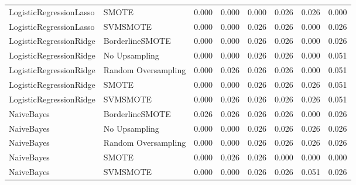 \begin{tabular}{llllllll}
     LogisticRegressionLasso &               SMOTE & 0.000 &                     0.000 &                 0.000 &                  0.026 &                                   0.026 &     0.000 \\
     LogisticRegressionLasso &            SVMSMOTE & 0.000 &                     0.000 &                 0.026 &                  0.026 &                                   0.000 &     0.026 \\
     LogisticRegressionRidge &     BorderlineSMOTE & 0.000 &                     0.000 &                 0.026 &                  0.026 &                                   0.000 &     0.026 \\
     LogisticRegressionRidge &       No Upsampling & 0.000 &                     0.000 &                 0.026 &                  0.026 &                                   0.000 &     0.051 \\
     LogisticRegressionRidge & Random Oversampling & 0.000 &                     0.026 &                 0.026 &                  0.026 &                                   0.000 &     0.051 \\
     LogisticRegressionRidge &               SMOTE & 0.000 &                     0.000 &                 0.026 &                  0.026 &                                   0.026 &     0.051 \\
     LogisticRegressionRidge &            SVMSMOTE & 0.000 &                     0.026 &                 0.026 &                  0.026 &                                   0.026 &     0.051 \\
                  NaiveBayes &     BorderlineSMOTE & 0.026 &                     0.026 &                 0.026 &                  0.026 &                                   0.000 &     0.026 \\
                  NaiveBayes &       No Upsampling & 0.000 &                     0.000 &                 0.026 &                  0.026 &                                   0.026 &     0.026 \\
                  NaiveBayes & Random Oversampling & 0.000 &                     0.000 &                 0.026 &                  0.026 &                                   0.026 &     0.026 \\
                  NaiveBayes &               SMOTE & 0.000 &                     0.026 &                 0.026 &                  0.000 &                                   0.000 &     0.000 \\
                  NaiveBayes &            SVMSMOTE & 0.000 &                     0.000 &                 0.026 &                  0.026 &                                   0.051 &     0.026 \\

\end{tabular}
